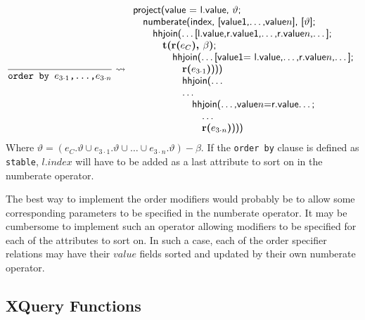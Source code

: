 \begin{equation*}
\frac{}{\mbox{\texttt{order by }}e_{3 \cdot 1}\mbox{\texttt{,\ldots,}}e_{3 \cdot n}} \leadsto
\begin{array}{l}
\mbox{\textsf{project(value = l.value, }}\vartheta\mbox{\textsf{;}}\\ \quad
\mbox{\textsf{numberate(index, [value1,\ldots,value}}n\mbox{\textsf{], [}}\vartheta\mbox{\textsf{];}} \\ \quad
\quad \mbox{\textsf{hhjoin(\ldots [l.value,r.value1,\ldots,r.value}}n\mbox{\textsf{,\ldots];}} \\ \quad
\quad \quad \mbox{\textbf{t(r(}}e_C\mbox{\textbf{), }}\beta\mbox{\textbf{)}\textsf{;}} \\ \quad \quad \quad
\quad \mbox{\textsf{hhjoin(\ldots [value1= l.value,\ldots,r.value}}n\mbox{\textsf{,\ldots];}}
\\\quad\quad\quad\quad\quad
\mbox{\textbf{r(}}e_{3 \cdot 1}\mbox{\textbf{)}\textsf{)))}}\\\quad\quad\quad\quad\quad
\mbox{\textsf{hhjoin(\ldots}}\\\quad\quad\quad\quad\quad
\mbox{\textsf{\ldots}}\\\quad\quad\quad\quad\quad\quad
\mbox{\textsf{hhjoin(\ldots,value}}n\mbox{\textsf{=r.value\ldots;}}\\\quad\quad\quad\quad\quad\quad\quad
\mbox{\textsf{\ldots}}\\\quad\quad\quad\quad\quad\quad\quad
\mbox{\textbf{r(}}e_{3 \cdot n}\mbox{\textbf{)}\textsf{)))}}
\end{array}
\end{equation*}
Where $\vartheta=(e_C.\vartheta \cup e_{3 \cdot 1}.\vartheta \cup \ldots \cup e_{3 \cdot n}.\vartheta) - \beta$.
If the \texttt{order by} clause is defined as \texttt{stable}, $l.index$ will have to be added as a last attribute
to sort on in the \textsf{numberate} operator.

The best way to implement the order modifiers would probably be to allow some corresponding parameters to be
specified in the \textsf{numberate} operator. It may be cumbersome to implement such an operator allowing
modifiers to be specified for each of the attributes to sort on. In such a case, each of the order specifier
relations may have their $value$ fields sorted and updated by their own \textsf{numberate} operator.


	
		
\subsection{XQuery Functions}
\label{sect:disc:functions}

